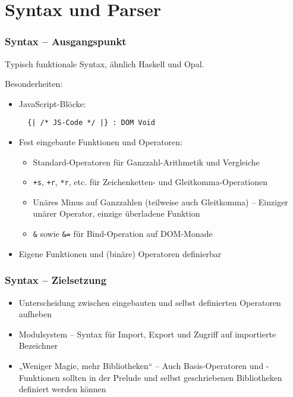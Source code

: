 \section{Syntax und Parser}

\begin{frame}[containsverbatim=true]
\frametitle{Syntax -- Ausgangspunkt}
Typisch funktionale Syntax, ähnlich Haskell und Opal.

Besonderheiten:
\begin{itemize}
\item JavaScript-Blöcke:
  \begin{lstlisting}
  {| /* JS-Code */ |} : DOM Void
  \end{lstlisting}
 \item Fest eingebaute Funktionen und Operatoren:
   \begin{itemize}
     \item Standard-Operatoren für Ganzzahl-Arithmetik und
       Vergleiche
     \item \verb|+s|, \verb|+r|, \verb|*r|, etc. für
       Zeichenketten- und Gleitkomma-Operationen
     \item Unäres Minus auf Ganzzahlen (teilweise auch Gleitkomma) --
       Einziger unärer Operator, einzige überladene Funktion
     \item \texttt{\&} sowie \texttt{\&=} für Bind-Operation auf DOM-Monade
   \end{itemize}
 \item Eigene Funktionen und (binäre) Operatoren
   definierbar
\end{itemize}
\end{frame}

\begin{frame}
\frametitle{Syntax -- Zielsetzung}
\begin{itemize}
\item Unterscheidung zwischen eingebauten und 
  selbst definierten Operatoren aufheben
\item Modulsystem -- Syntax für Import, Export
  und Zugriff auf importierte Bezeichner
\item „Weniger Magie, mehr Bibliotheken“ -- Auch 
  Basis-Operatoren und -Funktionen sollten in 
  der Prelude und selbst geschriebenen Bibliotheken
  definiert werden können
\end{itemize}
\end{frame}

